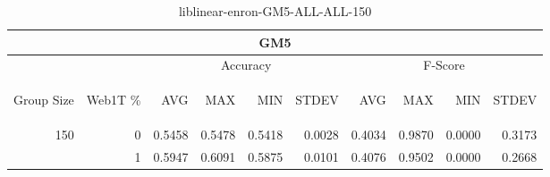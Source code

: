 \begin{center}
\begin{table}[htbp]
\begin{tabular}{ | r | r | r | r | r | r | r | r | r | r |}
\hline
\multicolumn{10}{|c|}{GM5}\\
\hline
 & & \multicolumn{4}{|c|}{Accuracy} & \multicolumn{4}{|c|}{F-Score}\\ \cline{3-10}
\begin{sideways}Group Size\end{sideways} & \begin{sideways}Web1T \%\end{sideways} & \begin{sideways}AVG\end{sideways} & \begin{sideways}MAX\end{sideways} & \begin{sideways}MIN\end{sideways} & \begin{sideways}STDEV\end{sideways} & \begin{sideways}AVG\end{sideways} & \begin{sideways}MAX\end{sideways} & \begin{sideways}MIN\end{sideways} & \begin{sideways}STDEV\end{sideways}\\
\hline
\multirow{2}{*}{150}
 & 0 & 0.5458 & 0.5478 & 0.5418 & 0.0028 & 0.4034 & 0.9870 & 0.0000 & 0.3173\\ \cline{2-10}
 & 1 & 0.5947 & 0.6091 & 0.5875 & 0.0101 & 0.4076 & 0.9502 & 0.0000 & 0.2668\\ \cline{2-10}
\hline
\end{tabular}
\caption{liblinear-enron-GM5-ALL-ALL-150}
\end{table}
\end{center}

